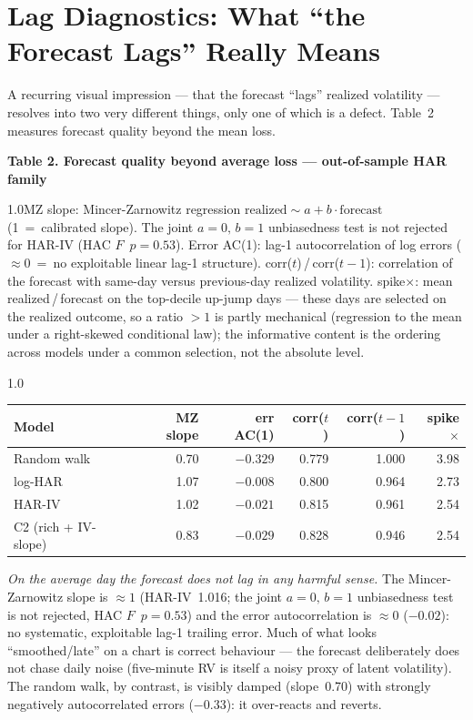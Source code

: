 \documentclass[12pt,a4paper]{article}
\newcommand{\tnote}[1]{\par\vspace{1.2ex}\begin{spacing}{1.0}\small\noindent #1\par\end{spacing}\vspace{1.2ex}}
\begin{document}
\section{Lag Diagnostics: What ``the Forecast Lags'' Really Means}

A recurring visual impression --- that the forecast ``lags'' realized volatility --- resolves into
two very different things, only one of which is a defect. Table~2 measures forecast
quality beyond the mean loss.

\begin{table}[t]\centering
\textbf{Table 2. Forecast quality beyond average loss --- out-of-sample HAR family}
\tnote{MZ slope: Mincer-Zarnowitz regression $\text{realized}\sim a+b\cdot\text{forecast}$ (1~=~calibrated
slope). The joint $a=0,\,b=1$ unbiasedness test is not rejected for HAR-IV (HAC $F$~$p=0.53$). Error
AC(1): lag-1 autocorrelation of log errors ($\approx0$~=~no exploitable linear lag-1 structure).
corr($t$)\,/\,corr($t{-}1$): correlation of the forecast with same-day versus previous-day realized
volatility. spike$\times$: mean realized\,/\,forecast on the top-decile up-jump days --- these days
are selected on the realized outcome, so a ratio $>1$ is partly mechanical (regression to the mean
under a right-skewed conditional law); the informative content is the ordering across models under a
common selection, not the absolute level.}
\begin{spacing}{1.0}
\begin{tabular}{lrrrrr}
\toprule
Model & MZ slope & err AC(1) & corr($t$) & corr($t{-}1$) & spike$\times$ \\
\midrule
Random walk           & 0.70 & $-0.329$ & 0.779 & 1.000 & 3.98 \\
log-HAR               & 1.07 & $-0.008$ & 0.800 & 0.964 & 2.73 \\
HAR-IV                & 1.02 & $-0.021$ & 0.815 & 0.961 & 2.54 \\
C2 (rich + IV-slope)  & 0.83 & $-0.029$ & 0.828 & 0.946 & 2.54 \\
\bottomrule
\end{tabular}
\end{spacing}
\label{tab:lag}
\end{table}

\emph{On the average day the forecast does not lag in any harmful sense.} The Mincer-Zarnowitz slope
is $\approx1$ (HAR-IV~1.016; the joint $a=0,\,b=1$ unbiasedness test is not rejected, HAC $F$~$p=0.53$)
and the error autocorrelation is $\approx0$ ($-0.02$): no systematic, exploitable lag-1 trailing
error. Much of what looks ``smoothed/late'' on a chart is correct behaviour --- the forecast
deliberately does not chase daily noise (five-minute RV is itself a noisy proxy of latent
volatility). The random walk, by contrast, is visibly damped (slope~0.70) with strongly negatively
autocorrelated errors ($-0.33$): it over-reacts and reverts.
\end{document}
